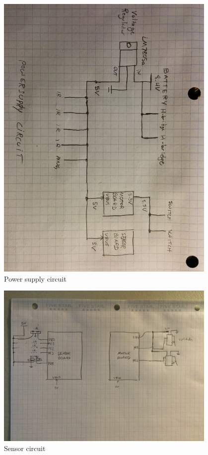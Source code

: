 \documentclass[12pt]{article}
\begin{document}
  \begin{figure}[b]
    \includegraphics[width=0.95\textwidth]{./img/power-supply-circuit.jpg}
    \caption{Power supply circuit}
    \label{fig:power-supply}
  \end{figure}
  \begin{figure}[b]
    \includegraphics[width=0.95\textwidth]{./img/sensor-circuit.jpg}
    \caption{Sensor circuit}
    \label{fig:sensor-circuit}
  \end{figure}
\end{document}
